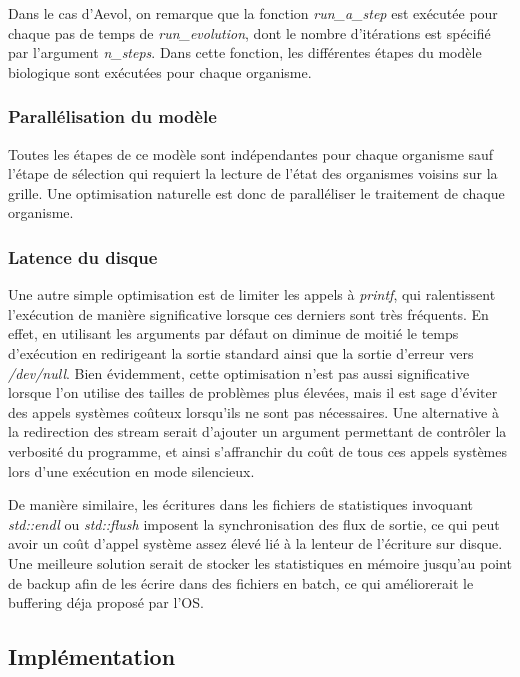 \documentclass[a4paper, 10pt, twoside]{article}
\begin{document}
Dans le cas d'Aevol, on remarque que la fonction \textit{run\_a\_step} est exécutée pour chaque pas de temps de \textit{run\_evolution}, dont le nombre d'itérations est spécifié par l'argument \textit{n\_steps}.
Dans cette fonction, les différentes étapes du modèle biologique sont exécutées pour chaque organisme.

\subsubsection*{Parallélisation du modèle}

Toutes les étapes de ce modèle sont indépendantes pour chaque organisme sauf l'étape de sélection qui requiert la lecture de l'état des organismes voisins sur la grille. Une optimisation naturelle est donc de paralléliser le traitement de chaque organisme\label{parallel/orga}.

\subsubsection*{Latence du disque}

Une autre simple optimisation est de limiter les appels à \textit{printf}, qui ralentissent l'exécution de manière significative lorsque ces derniers sont très fréquents. En effet, en utilisant les arguments par défaut on diminue de moitié le temps d'exécution en redirigeant la sortie standard ainsi que la sortie d'erreur vers \textit{/dev/null}. Bien évidemment, cette optimisation n'est pas aussi significative lorsque l'on utilise des tailles de problèmes plus élevées, mais il est sage d'éviter des appels systèmes coûteux lorsqu'ils ne sont pas nécessaires. Une alternative à la redirection des stream serait d'ajouter un argument permettant de contrôler la verbosité du programme, et ainsi s'affranchir du coût de tous ces appels systèmes lors d'une exécution en mode silencieux.

De manière similaire, les écritures dans les fichiers de statistiques invoquant \textit{std::endl} ou \textit{std::flush} imposent la synchronisation des flux de sortie, ce qui peut avoir un coût d'appel système assez élevé lié à la lenteur de l'écriture sur disque. Une meilleure solution serait de stocker les statistiques en mémoire jusqu'au point de backup afin de les écrire dans des fichiers en batch, ce qui améliorerait le buffering déja proposé par l'OS.

\subsection{Implémentation}
\end{document}
